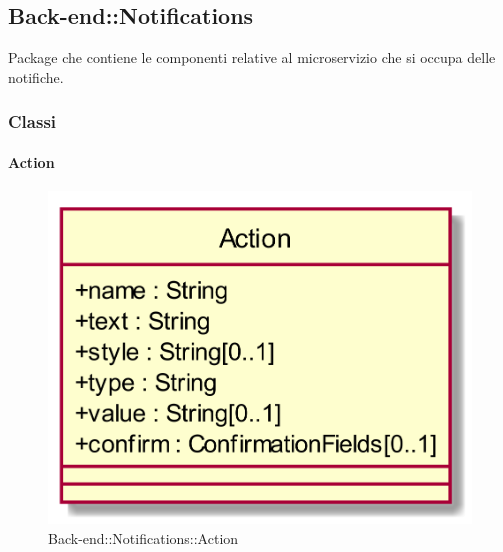 \subsection{Back-end::Notifications}
Package che contiene le componenti relative al microservizio che si occupa delle notifiche.
\subsubsection{Classi}
\hypertarget{Action_label}{\paragraph{Action}}
\begin{figure}[h]
	\centering
	\includegraphics[width=\textwidth,height=\textheight,keepaspectratio]{images/ClassAction.png}
	\caption{Back-end::Notifications::Action}
\end{figure}
